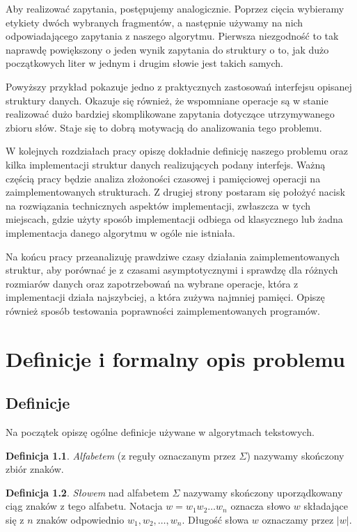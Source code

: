 \documentclass[declaration,shortabstract]{iithesis}
\theoremstyle{definition} \newtheorem{definition}{Definicja}[chapter]
\theoremstyle{remark} \newtheorem{remark}[definition]{Obserwacja}
\theoremstyle{plain} \newtheorem{theorem}[definition]{Twierdzenie}
\theoremstyle{remark} \newtheorem{example}{Przykład}[definition]
\theoremstyle{plain} \newtheorem{lemma}[definition]{Lemat}
\begin{document}
Aby realizować zapytania, postępujemy analogicznie. Poprzez cięcia wybieramy etykiety dwóch wybranych fragmentów, a następnie używamy na nich odpowiadającego zapytania z naszego algorytmu. Pierwsza niezgodność to tak naprawdę powiększony o jeden wynik zapytania do struktury o to, jak dużo początkowych liter w jednym i drugim słowie jest takich samych.

Powyższy przykład pokazuje jedno z praktycznych zastosowań interfejsu opisanej struktury danych. Okazuje się również, że wspomniane operacje są w stanie realizować dużo bardziej skomplikowane zapytania dotyczące utrzymywanego zbioru słów. Staje się to dobrą motywacją do analizowania tego problemu. 

W kolejnych rozdziałach pracy opiszę dokładnie definicję naszego problemu oraz kilka implementacji struktur danych realizujących podany interfejs. Ważną częścią pracy będzie analiza złożoności czasowej i pamięciowej operacji na zaimplementowanych strukturach. Z drugiej strony postaram się położyć nacisk na rozwiązania technicznych aspektów implementacji, zwłaszcza w tych miejscach, gdzie użyty sposób implementacji odbiega od klasycznego lub żadna implementacja danego algorytmu w ogóle nie istniała.

Na końcu pracy przeanalizuję prawdziwe czasy działania zaimplementowanych struktur, aby porównać je z czasami asymptotycznymi i sprawdzę dla różnych rozmiarów danych oraz zapotrzebowań na wybrane operacje, która z implementacji działa najszybciej, a która zużywa najmniej pamięci. Opiszę również sposób testowania poprawności zaimplementowanych programów.

\chapter{Definicje i formalny opis problemu}

\section{Definicje}

Na początek opiszę ogólne definicje używane w algorytmach tekstowych.

\begin{definition}
    \textit{Alfabetem} (z reguły oznaczanym przez $\Sigma$) nazywamy skończony zbiór znaków.    
\end{definition}

\begin{definition}
    \textit{Słowem} nad alfabetem $\Sigma$ nazywamy skończony uporządkowany ciąg znaków z tego alfabetu. Notacja $w = w_1 w_2 \ldots w_{n}$ oznacza słowo $w$ składające się z $n$ znaków odpowiednio $w_1, w_2, \ldots, w_{n}$. Długość słowa $w$ oznaczamy przez $|w|$.
\end{definition}
\end{document}
